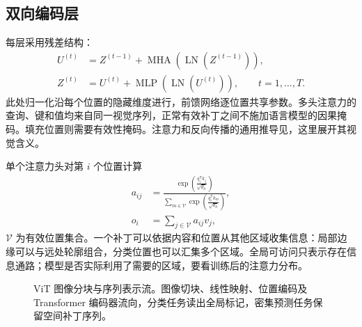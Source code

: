 \documentclass[../textbook.tex]{subfiles}
\begin{document}
\subsection{双向编码层}
每层采用残差结构：
\begin{align}
 U^{(t)}&=Z^{(t-1)}+\operatorname{MHA}(\operatorname{LN}(Z^{(t-1)})),\\
 Z^{(t)}&=U^{(t)}+\operatorname{MLP}(\operatorname{LN}(U^{(t)})),\qquad t=1,\ldots,T.
 \label{eq:vit-block}
\end{align}
此处归一化沿每个位置的隐藏维度进行，前馈网络逐位置共享参数。多头注意力的查询、键和值均来自同一视觉序列，正常有效补丁之间不施加语言模型的因果掩码。填充位置则需要有效性掩码。注意力和反向传播的通用推导见，这里展开其视觉含义。

单个注意力头对第 $i$ 个位置计算
\begin{equation}\label{eq:vit-visual-attn}
 \begin{aligned}
  a_{ij}&=\frac{\exp(\frac{q_i^{\mathsf T}k_j}{\sqrt{d_h}})}{\sum_{m\in\mathcal V}\exp(\frac{q_i^{\mathsf T}k_m}{\sqrt{d_h}})},\\
  o_i&=\sum_{j\in\mathcal V}a_{ij}v_j,
 \end{aligned}
\end{equation}
$\mathcal V$ 为有效位置集合。一个补丁可以依据内容和位置从其他区域收集信息：局部边缘可以与远处轮廓组合，分类位置也可以汇集多个区域。全局可访问只表示存在信息通路；模型是否实际利用了需要的区域，要看训练后的注意力分布。

\begin{figure}[htbp]
\centering
{}
\caption[ViT 图像分块与序列表示流]{ViT 图像分块与序列表示流。图像切块、线性映射、位置编码及 Transformer 编码器流向，分类任务读出全局标记，密集预测任务保留空间补丁序列。}\label{fig:vit-system}
\end{figure}
\end{document}
